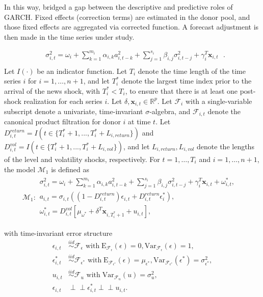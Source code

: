 \documentclass[11pt]{article}
\newcommand{\x}{\textbf{x}}
\newcommand{\simiid}{\stackrel{iid}{\sim}} %
\newcommand{\indep}{\perp \!\!\! \perp } %
\def\mrm#1{\mathrm{#1}} %
\def\mc#1{\mathcal{#1}} %
\def\mc#1{\mathcal{#1}}
\theoremstyle{definition}
\begin{document}
In this way, \cite{lundquist2024volatility} bridged a gap between the descriptive and predictive roles of GARCH.  Fixed effects (correction terms) are estimated in the donor pool, and those fixed effects are aggregated via corrected function.  A forecast adjustment is then made in the time series under study.


\begin{align*}
  &\sigma_{i,t}^{2} = \omega_{i} + \sum^{m_{i}}_{k=1}\alpha_{i,k}a^{2}_{i,t-k} + \sum_{j=1}^{s_{i}}\beta_{i,j}\sigma_{i,t-j}^{2} + \gamma_{i}^{T} \x_{i,t} \text{ }. \\
  \end{align*}
  Let $I(\cdot)$ be an indicator function.  Let $T_i$ denote the time length of the time series $i$ for $i = 1, \ldots, n+1$, and let $T_i^*$ denote the largest time index prior to the arrival of the news shock, with $T_i^* < T_i$, to ensure that there is at least one post-shock realization for each series $i$.  Let $\delta, \x_{i,t} \in \mathbb{R}^{p}$.  Let $\mathcal{F}_{i}$ with a single-variable subscript denote a univariate, time-invariant $\sigma$-algebra, and $\mathcal{F}_{i,t}$ denote the canonical product filtration for donor $i$ at time $t$.  Let $D^{return}_{i,t} = I(t \in \{T_i^* + 1,...,T_i^* + L_{i, return}\})$ and $D^{vol}_{i,t} = I(t \in \{T_i^* + 1,...,T_i^* + L_{i, vol}\})$, and let $L_{i,return},L_{i,vol}$ denote the lengths of the level and volatility shocks, respectively.  For $t= 1, \ldots, T_i$ and $i = 1, \ldots, n+1$, the model $\mc{M}_1$ is defined as 
  \begin{align*}
    \mc{M}_1 \colon \begin{array}{l}
       \sigma^{2}_{i,t} = \omega_{i} + \sum^{m_{i}}_{k=1}\alpha_{i,k}a^{2}_{i,t-k} + \sum_{j=1}^{s_{i}}\beta_{i,j}\sigma_{i,t-j}^{2} + \gamma_{i}^{T} \x_{i,t} + \omega^{*}_{i,t}, \text{ }\\[.2cm]
       a_{i,t} = \sigma_{i,t}((1-D^{return}_{i,t})\epsilon_{i,t} + D^{return}_{i,t}\epsilon^{*}_{i}),\\[.2cm]
      \omega_{i,t}^{*} = D^{vol}_{i,t}[\mu_{\omega^{*}}+\delta^{T}\x_{i,T^{*}_{i}+1}+ u_{i,t}],
    \end{array}
    \end{align*}
  
  with time-invariant error structure
    \begin{align*}
      \epsilon_{i,t} &\simiid \mc{F}_{\epsilon} \text{ with}  \; \mrm{E}_{\mc{F}_{\epsilon}}(\epsilon) = 0, \mrm{Var}_{\mc{F}_{\epsilon}}(\epsilon)  = 1,  \\
      \epsilon^{*}_{i,t} &\simiid \mc{F}_{\epsilon^{*}} \text{ with}  \; \mrm{E}_{\mc{F}_{\epsilon^{*}}}(\epsilon) = \mu_{\epsilon^{*}}, \mrm{Var}_{\mc{F}_{\epsilon^{*}}}(\epsilon^{*})  = \sigma^2_{\epsilon^{*}},  \\
      u_{i,t} & \simiid  \mc{F}_{u} \text{ with}  \; \mrm{Var}_{\mc{F}_{u}}(u) = \sigma^2_{u},\\
      \epsilon_{i,t} & \indep  \epsilon^{*}_{i,t}  \indep u_{i,t}.
      \end{align*}
  
\end{document}
